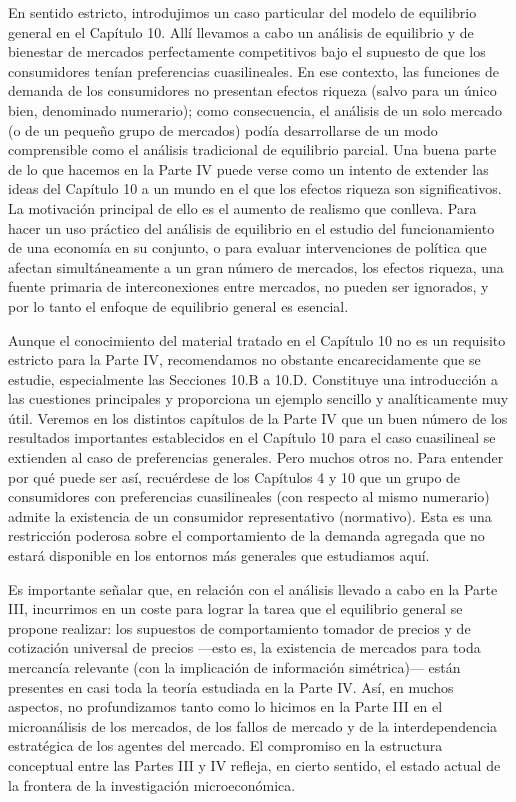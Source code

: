 \documentclass[10pt,a4paper]{article}
\begin{document}
En sentido estricto, introdujimos un caso particular del modelo de equilibrio general en el Capítulo 10. Allí llevamos a cabo un análisis de equilibrio y de bienestar de mercados perfectamente competitivos bajo el supuesto de que los consumidores tenían preferencias cuasilineales. En ese contexto, las funciones de demanda de los consumidores no presentan efectos riqueza (salvo para un único bien, denominado numerario); como consecuencia, el análisis de un solo mercado (o de un pequeño grupo de mercados) podía desarrollarse de un modo comprensible como el análisis tradicional de equilibrio parcial. Una buena parte de lo que hacemos en la Parte IV puede verse como un intento de extender las ideas del Capítulo 10 a un mundo en el que los efectos riqueza son significativos. La motivación principal de ello es el aumento de realismo que conlleva. Para hacer un uso práctico del análisis de equilibrio en el estudio del funcionamiento de una economía en su conjunto, o para evaluar intervenciones de política que afectan simultáneamente a un gran número de mercados, los efectos riqueza, una fuente primaria de interconexiones entre mercados, no pueden ser ignorados, y por lo tanto el enfoque de equilibrio general es esencial.

Aunque el conocimiento del material tratado en el Capítulo 10 no es un requisito estricto para la Parte IV, recomendamos no obstante encarecidamente que se estudie, especialmente las Secciones 10.B a 10.D. Constituye una introducción a las cuestiones principales y proporciona un ejemplo sencillo y analíticamente muy útil. Veremos en los distintos capítulos de la Parte IV que un buen número de los resultados importantes establecidos en el Capítulo 10 para el caso cuasilineal se extienden al caso de preferencias generales. Pero muchos otros no. Para entender por qué puede ser así, recuérdese de los Capítulos 4 y 10 que un grupo de consumidores con preferencias cuasilineales (con respecto al mismo numerario) admite la existencia de un consumidor representativo (normativo). Esta es una restricción poderosa sobre el comportamiento de la demanda agregada que no estará disponible en los entornos más generales que estudiamos aquí.

Es importante señalar que, en relación con el análisis llevado a cabo en la Parte III, incurrimos en un coste para lograr la tarea que el equilibrio general se propone realizar: los supuestos de comportamiento tomador de precios y de cotización universal de precios —esto es, la existencia de mercados para toda mercancía relevante (con la implicación de información simétrica)— están presentes en casi toda la teoría estudiada en la Parte IV. Así, en muchos aspectos, no profundizamos tanto como lo hicimos en la Parte III en el microanálisis de los mercados, de los fallos de mercado y de la interdependencia estratégica de los agentes del mercado. El compromiso en la estructura conceptual entre las Partes III y IV refleja, en cierto sentido, el estado actual de la frontera de la investigación microeconómica.
\end{document}
